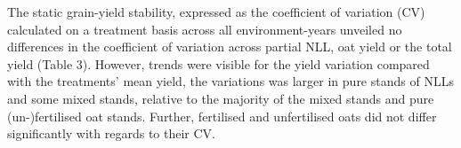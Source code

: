 \documentclass[
  british,
  a4paper,
  DIV=11,
  numbers=noendperiod]{scrreprt}
\begin{document}
The static grain-yield stability, expressed as the coefficient of
variation (CV) calculated on a treatment basis across all
environment-years unveiled no differences in the coefficient of
variation across partial NLL, oat yield or the total yield (Table 3).
However, trends were visible for the yield variation compared with the
treatments' mean yield, the variations was larger in pure stands of NLLs
and some mixed stands, relative to the majority of the mixed stands and
pure (un-)fertilised oat stands. Further, fertilised and unfertilised
oats did not differ significantly with regards to their CV.

\begin{table}

\caption{\label{tbl-overview}}


\end{table}%
\end{document}
